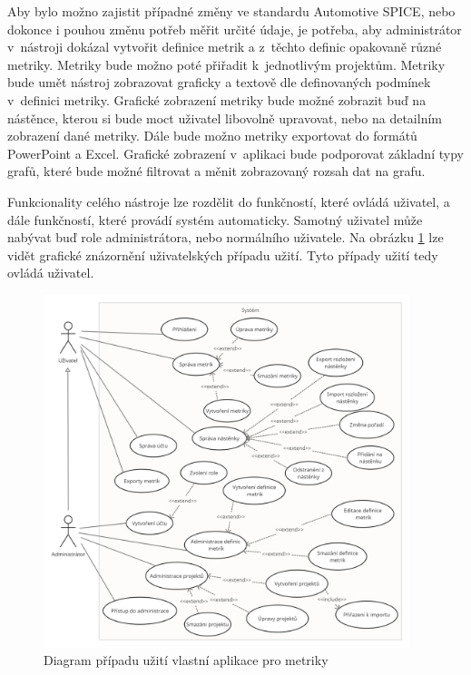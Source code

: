 \documentclass[czech,master]{diploma}
\begin{document}
Aby bylo možno zajistit případné změny ve standardu Automotive SPICE, nebo dokonce i pouhou změnu potřeb měřit určité údaje, je potřeba, aby administrátor v~nástroji dokázal vytvořit definice metrik a z~těchto definic opakovaně různé metriky. Metriky bude možno poté přiřadit k~jednotlivým projektům. Metriky bude umět nástroj zobrazovat graficky a textově dle definovaných podmínek v~definici metriky. Grafické zobrazení metriky bude možné zobrazit buď na nástěnce, kterou si bude moct uživatel libovolně upravovat, nebo na detailním zobrazení dané metriky. Dále bude možno metriky exportovat do formátů PowerPoint a Excel. Grafické zobrazení v~aplikaci bude podporovat základní typy grafů, které bude možné filtrovat a měnit zobrazovaný rozsah dat na grafu.

Funkcionality celého nástroje lze rozdělit do funkčností, které ovládá uživatel, a dále funkčností, které provádí systém automaticky. Samotný uživatel může nabývat buď role administrátora, nebo normálního uživatele. Na obrázku \ref{fig:jazz_metrics_use_case} lze vidět grafické znázornění uživatelských případu užití. Tyto případy užití tedy ovládá uživatel.

\begin{figure}[!ht]
    \centering
    \includegraphics[width=0.95\textwidth]{Diplomka/Figures/use_case_jazz.png}
    \caption{Diagram případu užití vlastní aplikace pro metriky}
    \label{fig:jazz_metrics_use_case}
\end{figure}
\end{document}

